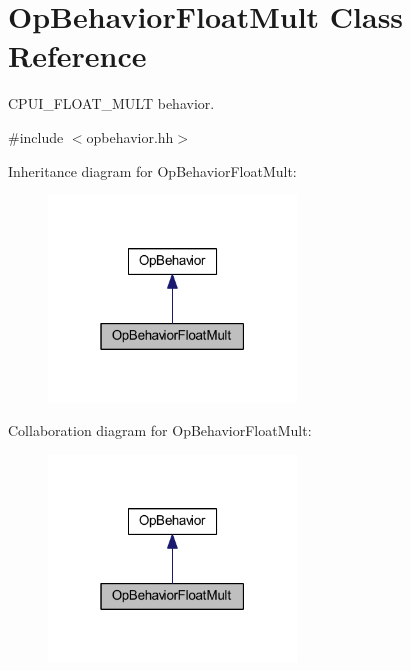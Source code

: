 \hypertarget{class_op_behavior_float_mult}{}\section{Op\+Behavior\+Float\+Mult Class Reference}
\label{class_op_behavior_float_mult}


C\+P\+U\+I\+\_\+\+F\+L\+O\+A\+T\+\_\+\+M\+U\+LT behavior.  




{\ttfamily \#include $<$opbehavior.\+hh$>$}



Inheritance diagram for Op\+Behavior\+Float\+Mult\+:
\nopagebreak
\begin{figure}[H]
\begin{center}
\leavevmode
\includegraphics[width=187pt]{class_op_behavior_float_mult__inherit__graph}
\end{center}
\end{figure}


Collaboration diagram for Op\+Behavior\+Float\+Mult\+:
\nopagebreak
\begin{figure}[H]
\begin{center}
\leavevmode
\includegraphics[width=187pt]{class_op_behavior_float_mult__coll__graph}
\end{center}
\end{figure}

